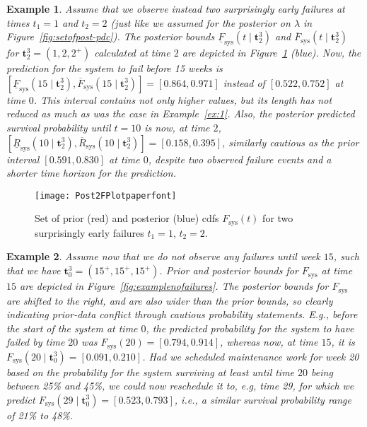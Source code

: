 \documentclass[12pt,a4paper,twocolumn,fleqn]{narms}
\renewcommand{\vec}[1]{{\bm#1}}
\newcommand{\ul}[1]{\underline{#1}}
\newcommand{\ol}[1]{\overline{#1}}
\newcommand{\lRsys}{\ul{R}_\text{sys}}
\newcommand{\uRsys}{\ol{R}_\text{sys}}
\newcommand{\Fsys}{F_\text{sys}}
\newcommand{\lFsys}{\ul{F}_\text{sys}}
\newcommand{\uFsys}{\ol{F}_\text{sys}}
\newtheorem{example}{Example}
\begin{document}
\begin{example}
\label{ex:2}
Assume that we observe instead two surprisingly early failures at times $t_1 = 1$ and $t_2 = 2$
(just like we assumed for the posterior on $\lambda$ in Figure~\ref{fig:setofpost-pdc}).
The posterior bounds $\lFsys(t \mid \vec{t}_2^3)$ and $\uFsys(t \mid \vec{t}_2^3)$
for $\vec{t}_2^3 = (1, 2, 2^+)$ calculated at time $2$
are depicted in Figure~\ref{fig:exampletwoearlyfailures} (blue).
Now, the prediction for the system to fail before 15 weeks
is $[\lFsys(15 \mid \vec{t}_2^3), \uFsys(15 \mid \vec{t}_2^3)] = [0.864, 0.971]$
instead of $[0.522, 0.752]$ at time $0$.
This interval contains not only higher values,
but its length has not reduced as much as was the case in Example~\ref{ex:1}.
Also, the posterior predicted survival probability until $t=10$
is now, at time $2$, $[\lRsys(10 \mid \vec{t}_2^3), \uRsys(10 \mid \vec{t}_2^3)] = [0.158,0.395]$,
similarly cautious as the prior interval $[0.591,0.830]$ at time $0$,
despite two observed failure events and a shorter time horizon for the prediction. 
\end{example}

\begin{figure}
\texttt{[image: Post2FPlotpaperfont]}
\caption{Set of prior (red) and posterior (blue) cdfs $F_\text{sys}(t)$ for two surprisingly early failures $t_1 = 1$, $t_2 = 2$.}
\label{fig:exampletwoearlyfailures}
\end{figure}

\begin{example}
\label{ex:3}
Assume now that we do not observe any failures until week $15$,
such that we have $\vec{t}_0^3 = (15^+, 15^+, 15^+)$.
Prior and posterior bounds for $\Fsys$ at time $15$ are depicted in Figure~\ref{fig:examplenofailures}.
The posterior bounds for $\Fsys$ are shifted to the right, and are also wider than the prior bounds,
so clearly indicating prior-data conflict through cautious probability statements.
E.g., before the start of the system at time $0$, the predicted probability for the system to have failed by time $20$
was $\Fsys(20) = [0.794, 0.914]$, whereas now, at time $15$, it is $\Fsys(20 \mid \vec{t}_0^3) = [0.091,0.210]$.
Had we scheduled maintenance work for week 20
based on the probability for the system surviving at least until time $20$ being between 25\% and 45\%,
we could now reschedule it to, e.g, time 29,
for which we predict $\Fsys(29 \mid \vec{t}_0^3) = [0.523,0.793]$,
i.e., a similar survival probability range of 21\% to 48\%.
\end{example}
\end{document}
